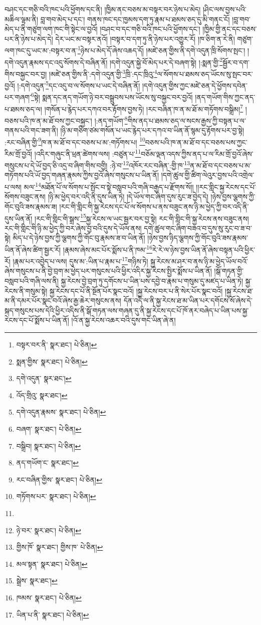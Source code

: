 བཤང་དང་གཅི་བའི་ཁང་པའི་ཕྱོགས་དང་ནི། །ཁྱིམ་ནང་བཅས་མ་བསྟར་བར་ཉེས་པ་མེད། །ཤིང་ལས་བྱས་པའི་མཆིལ་ལྷམ་ནི། བླ་གབ་མེད་པ་དང་། གནས་ཁང་དང་ཁྱམས་དག་ཏུ་རྣམ་པ་ཐམས་ཅད་དུ་མི་གནང་ངོ། །བླ་གབ་མེད་པ་ནི་གཙུག་ལག་ཁང་གི་སྟེང་ལ་བྱའོ། །བཤང་བ་དང་གཅི་བའི་ཁང་པའི་ཕྱོགས་དང་། །ཁྱིམ་གྱི་ནང་དང་བཅས་པར་ནི་ཉེས་པ་མེད་དེ། དེར་ཡང་མ་བསྟར་ནའོ། །བསྟར་བ་དག་ཏུ་ནི་ཉེས་པར་འགྱུར་རོ། །ཁ་ཅིག་ན་རེ་ནི། གཙུག་ལག་ཁང་དུ་ཡང་མ་:བསྟར་བ་ན་\footnote{བསྟར་བར་ནི་  སྣར་ཐང་།  པེ་ཅིན། }ཉེས་པ་མེད་དོ་ཞེས་འཆད་དོ། །མཛེ་ཅན་གྱིས་ནི་དགེ་འདུན་ཁྲི་སོགས་སྤང་། །དགེ་འདུན་རྣམས་དང་འདུ་སོགས་དེ་བཞིན་ནོ། །དགེ་འདུན་སྐྱེ་བོ་མེད་པར་དེ་བཞག་སྟེ། །:སྨན་གྱི་\footnote{སྨན་གྱིས་  སྣར་ཐང་།  པེ་ཅིན། }སྦྱོར་བ་དག་གིས་བསྐྱང་བར་བྱ། །མཛེ་ཅན་གྱིས་ནི་:དགེ་འདུན་གྱི་\footnote{དགེ་འདུན་  སྣར་ཐང་། }ཁྲི་:དང་ཁྲིའུ་\footnote{འོད་གྲིའུ་  སྣར་ཐང་། }ལ་སོགས་པ་ཐམས་ཅད་ཡོངས་སུ་སྤང་བར་བྱའོ། །:དགེ་འདུན་\footnote{དགེ་འདུན་རྣམས་  སྣར་ཐང་།  པེ་ཅིན། }དང་འདུ་བ་ལ་སོགས་པ་ཡང་དེ་བཞིན་ནོ། །དགེ་འདུན་གྱིས་ཀྱང་མཛེ་ཅན་དེ་ཕྱོགས་དབེན་པར་གཞག་\footnote{བཞག་  སྣར་ཐང་།  པེ་ཅིན། }སྟེ། སྨན་དང་ནད་གཡོག་ཉེ་བར་བསྒྲུབས་པས་ཡོངས་སུ་བསྐྱང་བར་བྱའོ། །ནད་གཡོག་གིས་ཀྱང་ནད་པ་ཐམས་ཅད་ལ། །གསོན་པ་རྙེད་པར་དཀའ་བར་རྟོགས་བྱས་ཏེ། །རང་བཞིན་ཁ་ན་མ་ཐོ་མ་གཏོགས་བསྒྲིམ།\footnote{བསྒྲིབ།  སྣར་ཐང་།  པེ་ཅིན། } །བཅས་པའི་ཁ་ན་མ་ཐོ་བས་ཀྱང་བསྐྱང་། །:ནད་གཡོག་\footnote{ནད་གཡོག་ང་  སྣར་ཐང་། }གིས་ནད་པ་ཐམས་ཅད་ལ་སངས་རྒྱས་ཀྱི་བསྟན་པ་ལ་གནས་པའི་གང་ཟག་ནི། །ཉི་མ་གཅིག་ཙམ་གསོན་པ་ཡང་རྙེད་པར་དཀའ་བ་ཡིན་ནོ་སྙམ་དུ་རྟོགས་པར་བྱ་སྟེ། :རང་བཞིན་གྱི་\footnote{རང་བཞིན་གྱིས་  སྣར་ཐང་།  པེ་ཅིན། }ཁ་ན་མ་ཐོ་བ་དང་བཅས་པ་མ་:གཏོགས་པ། \footnote{གཏོགས་པར་  སྣར་ཐང་།  པེ་ཅིན། }བཅས་པའི་ཁ་ན་མ་ཐོ་བ་དང་བཅས་པས་ཀྱང་རིམ་གྲོ་བྱའོ། །འདིར་གཞུང་ནི་ཕྲན་ཚེགས་ལས། :བཙུན་པ་\footnote{}བཅོམ་ལྡན་འདས་ཀྱིས་ནད་པ་ལ་རིམ་གྲོ་བྱའོ་ཞེས་གསུངས་པ་དེ་ཡོ་བྱད་ཅི་འདྲ་བ་ཞིག་གིས་བགྱི། :ཉེ་བ་\footnote{ཉེ་བར་  སྣར་ཐང་།  པེ་ཅིན། }འཁོར་རང་བཞིན་:གྱི་ཁ་\footnote{གྱིས་ཁོ་  སྣར་ཐང་། གྱིས་ཁ་  པེ་ཅིན། }ན་མ་ཐོ་བ་དང་བཅས་པ་མ་གཏོགས་པའི་ཡོ་བྱད་གཞན་རྣམས་ཀྱིས་བྱའོ་ཞེས་གསུངས་པ་ཡིན་ནོ། །དགེ་ཚུལ་གྱི་ཚིག་ལེའུར་བྱས་པའི་འགྲེལ་པ་ལས། མལ་\footnote{མལ་སྟན་  སྣར་ཐང་།  པེ་ཅིན། }མཐོན་པོ་ལ་སོགས་པ་སྤོང་བ་སྟེ་བསླབ་པའི་གཞི་བརྒྱད་པ་རྫོགས་སོ།། །།རང་གླིང་སྐྱ་རེངས་དང་པོ་སོགས་བཟུང་ནས། །ཉི་མ་ཕྱེད་བར་འདི་ནི་དུས་ཡིན་ཏེ། །དེ་ཡོལ་གང་ཞིག་དུས་རུང་ཟ་བྱེད་དེ། །ཉེས་བྱས་ལྕགས་ཀྱི་གོང་བུའི་ཟས་རྣམས་ཟ། །རང་གི་གླིང་གི་སྐྱ་རེངས་དང་པོ་ལ་སོགས་པ་ནས་བཟུང་ནས་ཉི་མ་ཕྱེད་ཀྱི་བར་འདི་ནི་དུས་ཡིན་ནོ། །རང་གི་གླིང་གི་སྒྲས་\footnote{སྒྲེས་  སྣར་ཐང་། }སྐྱ་རེངས་ལ་ཡང་སྦྱར་བར་བྱ་སྟེ། རང་གི་གླིང་གི་སྐྱ་རེངས་ནས་བཟུང་ནས། རང་གི་གླིང་གི་ཉི་མ་ཕྱེད་ཀྱི་བར་ཞེས་བྱ་བའི་དུས་དེ་ཡོལ་ནས། དགེ་ཚུལ་གང་ཞིག་བཟའ་བ་དུས་སུ་རུང་བ་ཟ་བ་སྟེ། མིད་པ་དེ་ཉེས་བྱས་ཀྱི་ལྕགས་ཀྱི་གོང་བུ་རྣམས་ཟ་བ་ཡིན་ནོ། །ཉེས་བྱས་ཉིད་ལྕགས་ཀྱི་གོང་བུའི་ཟས་རྣམས་ཡིན་ནོ་ཞེས་ཚིག་སྦྱར་རོ། །རྣམས་ཞེས་མང་པོར་སྨོས་པ་ནི་ཁམ་\footnote{ཁམས་  སྣར་ཐང་།  པེ་ཅིན། }རེ་རེ་ལ་ཉེས་བྱས་ཡིན་ནོ་ཞེས་བསྟན་པའི་ཕྱིར་རོ། །རྣམ་པར་འབྱེད་པ་ལས། དུས་མ་:ཡིན་པ་རྣམ་པ་\footnote{ཡིན་པ་ནི་  སྣར་ཐང་།  པེ་ཅིན། }གཉིས་ཏེ། སྐྱ་རེངས་མ་ཤར་བ་ནས་ཉི་མ་ཕྱེད་ཡོལ་བའོ་ཞེས་གསུངས་པ་ནི་བྱེ་བྲག་མ་ཕྱེད་པར་གསུངས་པའི་ཕྱིར་འདིར་སྐྱ་རེངས་སྤྱིར་སྨོས་པ་ཡིན་ནོ། །སྒོ་གཏན་གྱི་བསླབ་པའི་གཞི་ལས་ནི། སྐྱ་རེངས་བྱེ་བྲག་ཏུ་དགོངས་པ་ཡིན་པས་དབྱེ་བ་རྣམ་པ་གསུམ་དུ་མཛད་པ་ཡིན་ཏེ། སྐྱ་རེངས་ནི་གསུམ་སྟེ། སྐྱ་རེངས་དང་པོ་ནི་སྔོན་པོར་སྣང་བའོ། །སྐྱ་རེངས་བར་པ་ནི་སེར་པོར་སྣང་བའོ། །སྐྱ་རེངས་ཐ་མ་ནི་དམར་པོར་སྣང་བའོ་ཞེས་རྒྱ་ཆེར་གསུངས་ནས། དོན་འདི་ལ་ནི་སྐྱ་རེངས་ཐ་མ་ཡིན་པར་དགོངས་སོ་ཞེས་དེ་སྐད་གསུངས་པས་དེའི་ཕྱིར་འདིས་ནི་སྒོ་གཏན་ལས་གཞན་དུ་ནི་སྐྱ་རེངས་དང་པོ་ཁོ་ནར་བཞེད་པ་ཡིན་པས་སྐྱ་རེངས་དང་པོ་སྨོས་པ་ཡིན་ནོ། །འོ་ན་སྐྱ་རེངས་འཆར་བའི་དུས་གང་ཡིན་ཞེ་ན། 